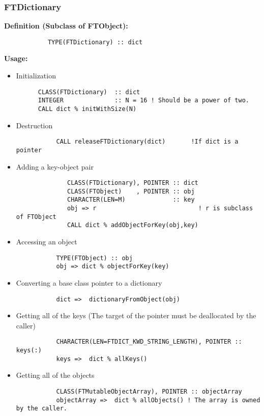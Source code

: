 \documentclass[9pt]{article}
\begin{document}
\subsubsection{FTDictionary}
     {\bf Definition (Subclass of FTObject):}
	{\color{blue}\begin{verbatim}
        	TYPE(FTDictionary) :: dict
	\end{verbatim}}
     {\bf Usage:}

\begin{itemize}
        \item Initialization
	{\color{blue}\begin{verbatim}
      CLASS(FTDictionary)  :: dict
      INTEGER              :: N = 16 ! Should be a power of two.
      CALL dict % initWithSize(N)
	\end{verbatim}}
	
        \item Destruction
		{\color{blue}\begin{verbatim}
           CALL releaseFTDictionary(dict)       !If dict is a pointer
	\end{verbatim}}
	
        \item Adding a key-object pair

	{\color{blue}\begin{verbatim}
              CLASS(FTDictionary), POINTER :: dict
              CLASS(FTObject)    , POINTER :: obj
              CHARACTER(LEN=M)             :: key
              obj => r                            ! r is subclass of FTObject
              CALL dict % addObjectForKey(obj,key)
	\end{verbatim}}
	
        \item Accessing an object

	{\color{blue}\begin{verbatim}
           TYPE(FTObject) :: obj
           obj => dict % objectForKey(key)
	\end{verbatim}}
	
        \item Converting a base class pointer to a dictionary
	{\color{blue}\begin{verbatim}
           dict =>  dictionaryFromObject(obj)
	\end{verbatim}}
		
        \item Getting all of the keys (The target of the pointer must be deallocated by the caller)
	{\color{blue}\begin{verbatim}
           CHARACTER(LEN=FTDICT_KWD_STRING_LENGTH), POINTER :: keys(:)
           keys =>  dict % allKeys()
	\end{verbatim}}
	
        \item Getting all of the objects
	{\color{blue}\begin{verbatim}
           CLASS(FTMutableObjectArray), POINTER :: objectArray
           objectArray =>  dict % allObjects() ! The array is owned by the caller.
	\end{verbatim}}
	
\end{itemize}
\end{document}
